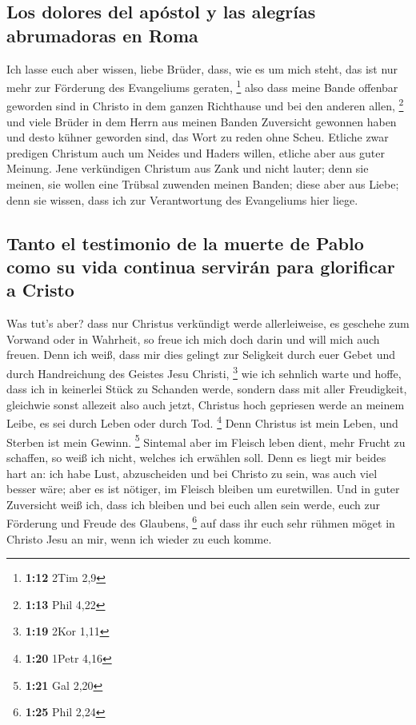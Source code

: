 \hypertarget{los-dolores-del-apuxf3stol-y-las-alegruxedas-abrumadoras-en-roma}{%
\subsection{Los dolores del apóstol y las alegrías abrumadoras en
Roma}\label{los-dolores-del-apuxf3stol-y-las-alegruxedas-abrumadoras-en-roma}}

 Ich lasse euch aber wissen, liebe Brüder, dass, wie es
um mich steht, das ist nur mehr zur Förderung des Evangeliums geraten,
\footnote{\textbf{1:12} 2Tim 2,9}  also dass meine Bande
offenbar geworden sind in Christo in dem ganzen Richthause und bei den
anderen allen, \footnote{\textbf{1:13} Phil 4,22}  und
viele Brüder in dem Herrn aus meinen Banden Zuversicht gewonnen haben
und desto kühner geworden sind, das Wort zu reden ohne Scheu.
 Etliche zwar predigen Christum auch um Neides und Haders
willen, etliche aber aus guter Meinung.  Jene verkündigen
Christum aus Zank und nicht lauter; denn sie meinen, sie wollen eine
Trübsal zuwenden meinen Banden;  diese aber aus Liebe;
denn sie wissen, dass ich zur Verantwortung des Evangeliums hier liege.

\hypertarget{tanto-el-testimonio-de-la-muerte-de-pablo-como-su-vida-continua-serviruxe1n-para-glorificar-a-cristo}{%
\subsection{Tanto el testimonio de la muerte de Pablo como su vida
continua servirán para glorificar a
Cristo}\label{tanto-el-testimonio-de-la-muerte-de-pablo-como-su-vida-continua-serviruxe1n-para-glorificar-a-cristo}}

 Was tut's aber? dass nur Christus verkündigt werde
allerleiweise, es geschehe zum Vorwand oder in Wahrheit, so freue ich
mich doch darin und will mich auch freuen.  Denn ich
weiß, dass mir dies gelingt zur Seligkeit durch euer Gebet und durch
Handreichung des Geistes Jesu Christi, \footnote{\textbf{1:19} 2Kor 1,11}
 wie ich sehnlich warte und hoffe, dass ich in keinerlei
Stück zu Schanden werde, sondern dass mit aller Freudigkeit, gleichwie
sonst allezeit also auch jetzt, Christus hoch gepriesen werde an meinem
Leibe, es sei durch Leben oder durch Tod. \footnote{\textbf{1:20} 1Petr
  4,16}  Denn Christus ist mein Leben, und Sterben ist
mein Gewinn. \footnote{\textbf{1:21} Gal 2,20}  Sintemal
aber im Fleisch leben dient, mehr Frucht zu schaffen, so weiß ich nicht,
welches ich erwählen soll.  Denn es liegt mir beides hart
an: ich habe Lust, abzuscheiden und bei Christo zu sein, was auch viel
besser wäre;  aber es ist nötiger, im Fleisch bleiben um
euretwillen.  Und in guter Zuversicht weiß ich, dass ich
bleiben und bei euch allen sein werde, euch zur Förderung und Freude des
Glaubens, \footnote{\textbf{1:25} Phil 2,24}  auf dass
ihr euch sehr rühmen möget in Christo Jesu an mir, wenn ich wieder zu
euch komme.

